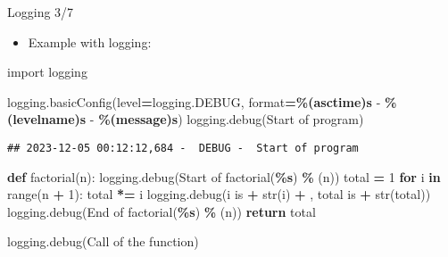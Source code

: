 \documentclass[
  8pt,
  ignorenonframetext,
]{beamer}
\newenvironment{Shaded}{\begin{snugshade}}{\end{snugshade}}
\newcommand{\BuiltInTok}[1]{#1}
\newcommand{\ControlFlowTok}[1]{\textcolor[rgb]{0.13,0.29,0.53}{\textbf{#1}}}
\newcommand{\DecValTok}[1]{\textcolor[rgb]{0.00,0.00,0.81}{#1}}
\newcommand{\ImportTok}[1]{#1}
\newcommand{\KeywordTok}[1]{\textcolor[rgb]{0.13,0.29,0.53}{\textbf{#1}}}
\newcommand{\NormalTok}[1]{#1}
\newcommand{\OperatorTok}[1]{\textcolor[rgb]{0.81,0.36,0.00}{\textbf{#1}}}
\newcommand{\SpecialCharTok}[1]{\textcolor[rgb]{0.81,0.36,0.00}{\textbf{#1}}}
\newcommand{\StringTok}[1]{\textcolor[rgb]{0.31,0.60,0.02}{#1}}
\providecommand{\tightlist}{%
  \setlength{\itemsep}{0pt}\setlength{\parskip}{0pt}}
\begin{document}
\begin{frame}[fragile]{Logging 3/7}
\protect\hypertarget{logging-37}{}
\begin{itemize}
\tightlist
\item
  Example with logging:
\end{itemize}

\begin{Shaded}
\begin{Highlighting}[]
\ImportTok{import}\NormalTok{ logging}

\NormalTok{logging.basicConfig(level}\OperatorTok{=}\NormalTok{logging.DEBUG, }\BuiltInTok{format}\OperatorTok{=}\StringTok{\textquotesingle{}}\SpecialCharTok{\%(asctime)s}\StringTok{ {-}  }\SpecialCharTok{\%(levelname)s}\StringTok{ {-}  }\SpecialCharTok{\%(message)s}\StringTok{\textquotesingle{}}\NormalTok{)}
\NormalTok{logging.debug(}\StringTok{\textquotesingle{}Start of program\textquotesingle{}}\NormalTok{)}
\end{Highlighting}
\end{Shaded}

\begin{verbatim}
## 2023-12-05 00:12:12,684 -  DEBUG -  Start of program
\end{verbatim}

\begin{Shaded}
\begin{Highlighting}[]
\KeywordTok{def}\NormalTok{ factorial(n):}
\NormalTok{    logging.debug(}\StringTok{\textquotesingle{}Start of factorial(}\SpecialCharTok{\%s}\StringTok{)\textquotesingle{}}  \OperatorTok{\%}\NormalTok{ (n))}
\NormalTok{    total }\OperatorTok{=} \DecValTok{1}
    \ControlFlowTok{for}\NormalTok{ i }\KeywordTok{in} \BuiltInTok{range}\NormalTok{(n }\OperatorTok{+} \DecValTok{1}\NormalTok{):}
\NormalTok{        total }\OperatorTok{*=}\NormalTok{ i}
\NormalTok{        logging.debug(}\StringTok{\textquotesingle{}i is \textquotesingle{}} \OperatorTok{+} \BuiltInTok{str}\NormalTok{(i) }\OperatorTok{+} \StringTok{\textquotesingle{}, total is \textquotesingle{}} \OperatorTok{+} \BuiltInTok{str}\NormalTok{(total))}
\NormalTok{    logging.debug(}\StringTok{\textquotesingle{}End of factorial(}\SpecialCharTok{\%s}\StringTok{)\textquotesingle{}}  \OperatorTok{\%}\NormalTok{ (n))}
    \ControlFlowTok{return}\NormalTok{ total}

\NormalTok{logging.debug(}\StringTok{\textquotesingle{}Call of the function\textquotesingle{}}\NormalTok{)}
\end{Highlighting}
\end{Shaded}


\end{frame}
\end{document}
